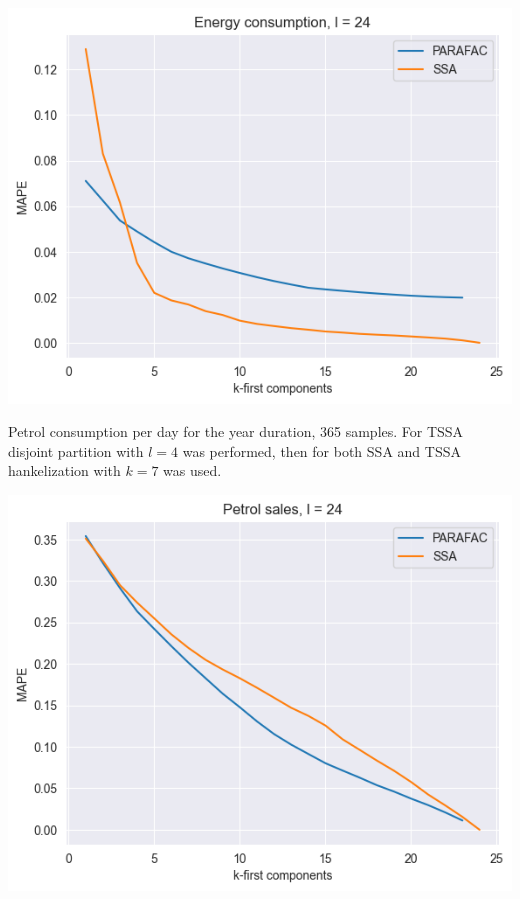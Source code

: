 \documentclass{article}
\begin{document}
\includegraphics[scale=0.7]{./images/result_bad.png}

Petrol consumption per day for the year duration, 365 samples. For TSSA disjoint partition with \(l = 4\) was performed, then for both SSA and TSSA hankelization with \(k = 7\) was used. 

\includegraphics[scale=0.7]{./images/result_good.png}

\end{document}
